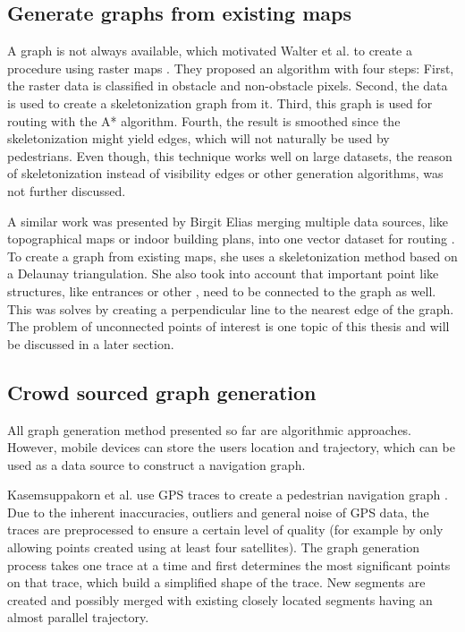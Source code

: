	\subsection{Generate graphs from existing maps}
	
		A graph is not always available, which motivated Walter et al. to create a procedure using raster maps \cite{walter-raster-maps}.
		They proposed an algorithm with four steps:
		First, the raster data is classified in obstacle and non-obstacle pixels.
		Second, the data is used to create a skeletonization graph from it.
		Third, this graph is used for routing with the A* algorithm.
		Fourth, the result is smoothed since the skeletonization might yield edges, which will not naturally be used by pedestrians.
		Even though, this technique works well on large datasets, the reason of skeletonization instead of visibility edges or other generation algorithms, was not further discussed.
		
		A similar work was presented by Birgit Elias merging multiple data sources, like topographical maps or indoor building plans, into one vector dataset for routing \cite{elias-tailored-geodatabase}.
		To create a graph from existing maps, she uses a skeletonization method based on a Delaunay triangulation.
		She also took into account that important point like structures, like entrances or other , need to be connected to the graph as well.
		This was solves by creating a perpendicular line to the nearest edge of the graph.
		The problem of unconnected points of interest is one topic of this thesis and will be discussed  in a later section.
		
	\subsection{Crowd sourced graph generation}
	
		All graph generation method presented so far are algorithmic approaches.
		However, mobile devices can store the users location and trajectory, which can be used as a data source to construct a navigation graph.
		
		Kasemsuppakorn et al. use GPS traces to create a pedestrian navigation graph \cite{kasemsuppakorn-gps-traces-pedestrain-network}.
		Due to the inherent inaccuracies, outliers and general noise of GPS data, the traces are preprocessed to ensure a certain level of quality (for example by only allowing points created using at least four satellites).
		The graph generation process takes one trace at a time and first determines the most significant points on that trace, which build a simplified shape of the trace.
		New segments are created and possibly merged with existing closely located segments having an almost parallel trajectory.
		
